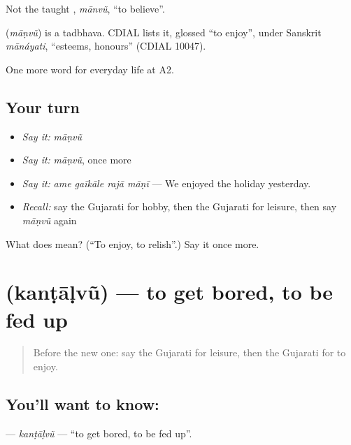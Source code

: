 Not the taught \textbf{}, \emph{mānvũ}, \textquotedblleft{}to believe\textquotedblright{}.

\begin{cousinweb}
\textbf{} (\emph{māṇvũ}) is a tadbhava. CDIAL lists it, glossed \textquotedblleft{}to enjoy\textquotedblright{}, under Sanskrit \emph{mānáyati}, \textquotedblleft{}esteems, honours\textquotedblright{} (CDIAL 10047).
\end{cousinweb}

\begin{grammarlens}[title={What you've built}]
One more word for everyday life at A2.
\end{grammarlens}

\subsection*{Your turn}
\begin{itemize}
\raggedright
  \item \emph{Say it:} \emph{māṇvũ}
  \item \emph{Say it:} \emph{māṇvũ}, once more
  \item \emph{Say it:} \emph{ame gaīkāle rajā māṇī} — We enjoyed the holiday yesterday.
  \item \emph{Recall:} say the Gujarati for hobby, then the Gujarati for leisure, then say \emph{māṇvũ} again
\end{itemize}

\begin{tcolorbox}[breakable,colback=teal!4,colframe=teal!35!black,title={Before you move on}]
What does  mean? (\textquotedblleft{}To enjoy, to relish\textquotedblright{}.) Say it once more.
\end{tcolorbox}
\section[\texorpdfstring{\gu{કંટાળવું} (kanṭāḷvũ)}{કંટાળવું (kanṭāḷvũ)}]{ (kanṭāḷvũ) — to get bored, to be fed up}

\label{lesson:GU-C253-kantalvu}



\begin{quote}
Before the new one: say the Gujarati for leisure, then the Gujarati for to enjoy.
\end{quote}

\subsection*{You'll want to know: }
\textbf{} — \emph{kanṭāḷvũ} — \textquotedblleft{}to get bored, to be fed up\textquotedblright{}.

